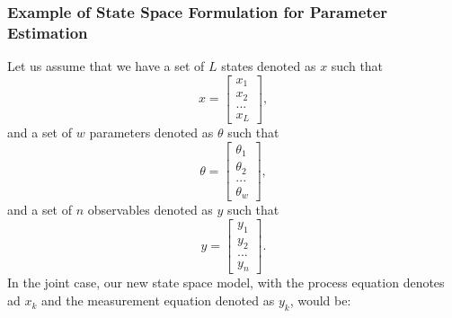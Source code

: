     \subsubsection{Example of State Space Formulation for Parameter Estimation}
    Let us assume that we have a set of $L$ states denoted as $x$ such that 
    \begin{equation}
    x = 
    \begin{bmatrix}
    x_1\\
    x_2\\
    ...\\
    x_L
    \end{bmatrix},
    \end{equation}
    and a set of $w$ parameters denoted as $\theta$ such that 
    \begin{equation}
    \theta = 
    \begin{bmatrix}
    \theta_1\\
    \theta_2\\
    ...\\
    \theta_w
    \end{bmatrix},
    \end{equation}
    and a set of $n$ observables denoted as $y$ such that 
    \begin{equation}
    y = 
    \begin{bmatrix}
    y_1\\
    y_2\\
    ...\\
    y_n
    \end{bmatrix}.
    \end{equation}
    In the joint case, our new state space model, with the process equation denotes ad $x_k$ and the measurement equation denoted as $y_k$, would be:\\
